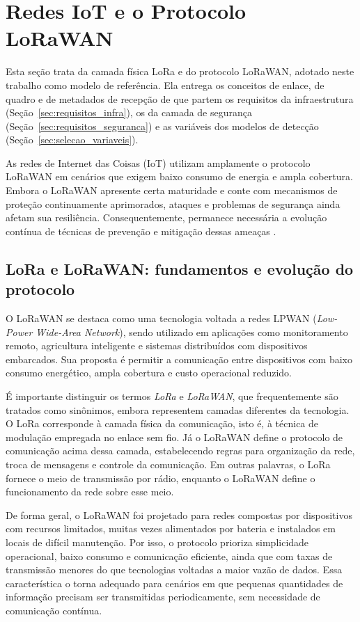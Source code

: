 \section{Redes IoT e o Protocolo LoRaWAN}

Esta seção trata da camada física LoRa e do protocolo LoRaWAN, adotado neste trabalho como modelo de referência. Ela entrega os conceitos de enlace, de quadro e de metadados de recepção de que partem os requisitos da infraestrutura (Seção~\ref{sec:requisitos_infra}), os da camada de segurança (Seção~\ref{sec:requisitos_seguranca}) e as variáveis dos modelos de detecção (Seção~\ref{sec:selecao_variaveis}).

As redes de Internet das Coisas (IoT) utilizam amplamente o protocolo LoRaWAN em cenários que exigem baixo consumo de energia e ampla cobertura. Embora o LoRaWAN apresente certa maturidade e conte com mecanismos de proteção continuamente aprimorados, ataques e problemas de segurança ainda afetam sua resiliência. Consequentemente, permanece necessária a evolução contínua de técnicas de prevenção e mitigação dessas ameaças \cite{hessel2023lorawan}.


\subsection{LoRa e LoRaWAN: fundamentos e evolução do protocolo}

O LoRaWAN se destaca como uma tecnologia voltada a redes LPWAN (\textit{Low-Power Wide-Area Network}), sendo utilizado em aplicações como monitoramento remoto, agricultura inteligente e sistemas distribuídos com dispositivos embarcados. Sua proposta é permitir a comunicação entre dispositivos com baixo consumo energético, ampla cobertura e custo operacional reduzido.

É importante distinguir os termos \textit{LoRa} e \textit{LoRaWAN}, que frequentemente são tratados como sinônimos, embora representem camadas diferentes da tecnologia. O LoRa corresponde à camada física da comunicação, isto é, à técnica de modulação empregada no enlace sem fio. Já o LoRaWAN define o protocolo de comunicação acima dessa camada, estabelecendo regras para organização da rede, troca de mensagens e controle da comunicação. Em outras palavras, o LoRa fornece o meio de transmissão por rádio, enquanto o LoRaWAN define o funcionamento da rede sobre esse meio.

De forma geral, o LoRaWAN foi projetado para redes compostas por dispositivos com recursos limitados, muitas vezes alimentados por bateria e instalados em locais de difícil manutenção. Por isso, o protocolo prioriza simplicidade operacional, baixo consumo e comunicação eficiente, ainda que com taxas de transmissão menores do que tecnologias voltadas a maior vazão de dados. Essa característica o torna adequado para cenários em que pequenas quantidades de informação precisam ser transmitidas periodicamente, sem necessidade de comunicação contínua.

